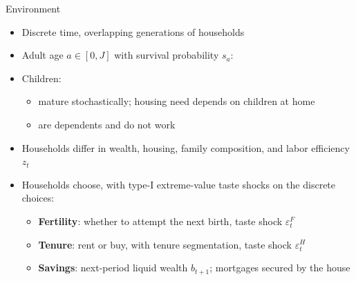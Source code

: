 \begin{frame}{Environment}
\small
\begin{itemize}\setlength\itemsep{1pt}
  \item Discrete time, overlapping generations of households
  \item Adult age $a\in[0,J]$ with survival probability $s_a$:\\[2pt]
  \hspace*{-\leftmargini}\hspace*{-2.5mm}
  \item Children:
  \begin{itemize}
    \item mature stochastically; housing need depends on children at home
    \item are dependents and do not work
  \end{itemize}
  \item Households differ in wealth, housing, family composition, and labor efficiency $z_t$
  \item Households choose, with type-I extreme-value taste shocks on the discrete choices:
  \begin{itemize}
    \item \textbf{Fertility}: whether to attempt the next birth, taste shock $\varepsilon^F_t$
    \item \textbf{Tenure}: rent or buy, with tenure segmentation, taste shock $\varepsilon^H_t$
    \item \textbf{Savings}: next-period liquid wealth $b_{t+1}$; mortgages secured by the house
  \end{itemize}
\end{itemize}
\end{frame}

